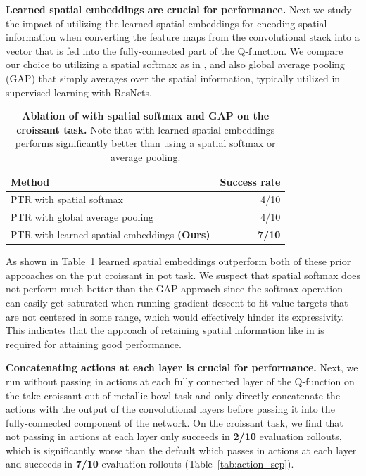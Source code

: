\documentclass[../thesis.tex]{subfiles}
\begin{document}
\textbf{Learned spatial embeddings are crucial for performance.} Next we study the impact of utilizing the learned spatial embeddings for encoding spatial information when converting the feature maps from the convolutional stack into a vector that is fed into the fully-connected part of the Q-function. We compare our choice to utilizing a spatial softmax as in \citet{ebert2021bridge}, and also global average pooling (GAP) that simply averages over the spatial information, typically utilized in supervised learning with ResNets.


\begin{table}[h]
\centering
\begin{tabular}{l|r}
\toprule
\textbf{Method} & \textbf{Success rate}\\  \midrule
PTR with spatial softmax & 4/10 \\
PTR with global average pooling & 4/10 \\
\midrule
PTR with learned spatial embeddings \textbf{(Ours)} & \textbf{7/10} \\
\bottomrule
\end{tabular}
\vspace{0.1cm}
\caption{\footnotesize{\textbf{Ablation of \ptrmethodname with spatial softmax and GAP on the croissant task.} Note that \ptrmethodname with learned spatial embeddings performs significantly better than using a spatial softmax or average pooling.}}
\label{tab:spatial}
\end{table}

As shown in {Table~\ref{tab:spatial}} learned spatial embeddings outperform both of these prior approaches on the put croissant in pot task. We suspect that spatial softmax does not perform much better than the GAP approach since the softmax operation can easily get saturated when running gradient descent to fit value targets that are not centered in some range, which would effectively hinder its expressivity. This indicates that the approach of retaining spatial information like in \ptrmethodname is required for attaining good performance.

\textbf{Concatenating actions at each layer is crucial for performance.} Next, we run \ptrmethodname without passing in actions at each fully connected layer of the Q-function on the take croissant out of metallic bowl task and only directly concatenate the actions with the output of the convolutional layers before passing it into the fully-connected component of the network. On the croissant task, we find that not passing in actions at each layer only succeeds in \textbf{2/10} evaluation rollouts, which is significantly worse than the default \ptrmethodname which passes in actions at each layer and succeeds in \textbf{7/10} evaluation rollouts (Table~\ref{tab:action_sep}).
\end{document}
